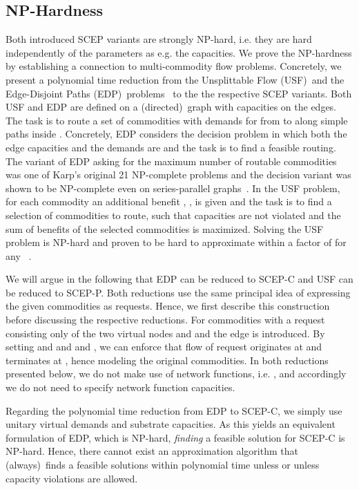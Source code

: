 \documentclass[10pt, conference, letterpaper]{IEEEtran}
\begin{document}
\subsection{NP-Hardness}
\label{sec:np-hardness}

Both introduced SCEP variants are strongly NP-hard, i.e. they are hard independently of the parameters as e.g. the capacities. We prove the NP-hardness 
by establishing a connection to multi-commodity flow problems.
Concretely, we present a polynomial time reduction from the Unsplittable Flow (USF)~and the Edge-Disjoint Paths (EDP)~problems~\cite{Guruswami2003473} to the  the respective SCEP variants. Both USF and EDP are defined on a (directed)~graph  with capacities  on the edges. The task is to route a set of  commodities  with demands  for  from   to  along simple paths inside . Concretely, EDP considers the decision problem in which both the edge capacities and the demands are  and the task is to find a feasible routing. The variant of EDP asking for the maximum number of routable commodities was one of Karp's original 21 NP-complete problems and the decision variant was shown to be NP-complete even on series-parallel graphs~\cite{Nishizeki2001177}. In the USF problem, for each commodity an additional benefit , , is given and the task is to find a selection of commodities to route, such that capacities are not violated and the sum of benefits of the selected commodities is maximized. Solving the USF problem is NP-hard and proven to be hard to approximate within a factor of  for any ~\cite{Guruswami2003473}.

We will argue in the following that EDP can be reduced to SCEP-C and USF can be reduced to SCEP-P. Both reductions use the same principal idea of expressing the given commodities as requests. Hence, we first describe this construction before discussing the respective reductions. For commodities  with  a request  consisting only of the two virtual nodes  and  and the edge  is introduced. By setting  and  and  and , we can enforce that flow of request  originates at  and terminates at , hence modeling the original commodities. In both reductions presented below, we do not make use of network functions, i.e. , and accordingly we do not need to specify network function capacities.

Regarding the polynomial time reduction from EDP to SCEP-C, we simply use unitary virtual demands and substrate capacities. As this yields an equivalent formulation of EDP, which is NP-hard, \emph{finding} a feasible solution for SCEP-C is NP-hard. Hence, there cannot exist an approximation algorithm that (always)~finds a feasible solutions within polynomial time unless  or unless capacity violations are allowed. 
\end{document}
